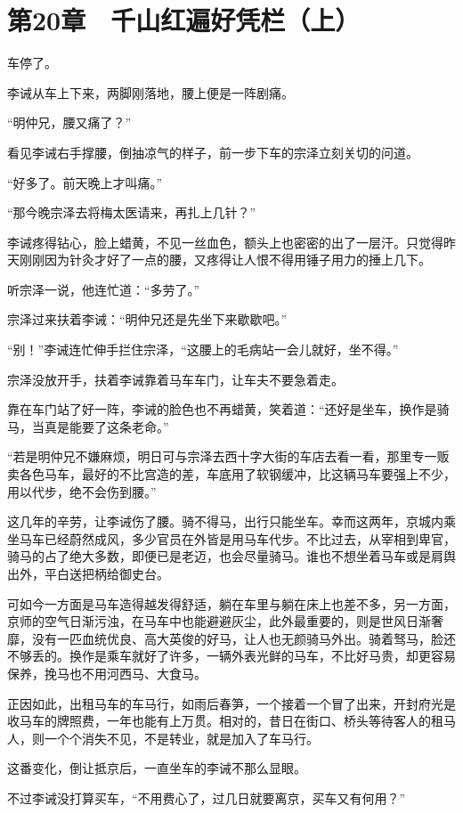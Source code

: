 \section{第20章　千山红遍好凭栏（上）}

车停了。

李诫从车上下来，两脚刚落地，腰上便是一阵剧痛。

“明仲兄，腰又痛了？”

看见李诫右手撑腰，倒抽凉气的样子，前一步下车的宗泽立刻关切的问道。

“好多了。前天晚上才叫痛。”

“那今晚宗泽去将梅太医请来，再扎上几针？”

李诫疼得钻心，脸上蜡黄，不见一丝血色，额头上也密密的出了一层汗。只觉得昨天刚刚因为针灸才好了一点的腰，又疼得让人恨不得用锤子用力的捶上几下。

听宗泽一说，他连忙道：“多劳了。”

宗泽过来扶着李诫：“明仲兄还是先坐下来歇歇吧。”

“别！”李诫连忙伸手拦住宗泽，“这腰上的毛病站一会儿就好，坐不得。”

宗泽没放开手，扶着李诫靠着马车车门，让车夫不要急着走。

靠在车门站了好一阵，李诫的脸色也不再蜡黄，笑着道：“还好是坐车，换作是骑马，当真是能要了这条老命。”

“若是明仲兄不嫌麻烦，明日可与宗泽去西十字大街的车店去看一看，那里专一贩卖各色马车，最好的不比宫造的差，车底用了软钢缓冲，比这辆马车要强上不少，用以代步，绝不会伤到腰。”

这几年的辛劳，让李诫伤了腰。骑不得马，出行只能坐车。幸而这两年，京城内乘坐马车已经蔚然成风，多少官员在外皆是用马车代步。不比过去，从宰相到卑官，骑马的占了绝大多数，即便已是老迈，也会尽量骑马。谁也不想坐着马车或是肩舆出外，平白送把柄给御史台。

可如今一方面是马车造得越发得舒适，躺在车里与躺在床上也差不多，另一方面，京师的空气日渐污浊，在马车中也能避避灰尘，此外最重要的，则是世风日渐奢靡，没有一匹血统优良、高大英俊的好马，让人也无颜骑马外出。骑着驽马，脸还不够丢的。换作是乘车就好了许多，一辆外表光鲜的马车，不比好马贵，却更容易保养，挽马也不用河西马、大食马。

正因如此，出租马车的车马行，如雨后春笋，一个接着一个冒了出来，开封府光是收马车的牌照费，一年也能有上万贯。相对的，昔日在街口、桥头等待客人的租马人，则一个个消失不见，不是转业，就是加入了车马行。

这番变化，倒让抵京后，一直坐车的李诫不那么显眼。

不过李诫没打算买车，“不用费心了，过几日就要离京，买车又有何用？”

